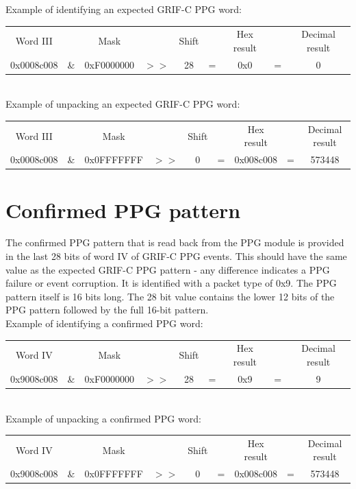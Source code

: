 \documentclass[letterpaper,12pt,notitlepage]{report}
\begin{document}
Example of identifying an expected GRIF-C PPG word:\\

\begin{tabular}{ccccccccc}
Word III &  & Mask & & Shift & & Hex result & & Decimal result\\
0x0008c008 & \& & 0xF0000000 & $>>$ & 28 & = & 0x0 & = & 0 \\
\end{tabular}\\

Example of unpacking an expected GRIF-C PPG word:\\

\begin{tabular}{ccccccccc}
Word III &  & Mask & & Shift & & Hex result & & Decimal result\\
0x0008c008 & \& & 0x0FFFFFFF & $>>$ & 0 & = & 0x008c008 & = & 573448 \\
\end{tabular}

\section{Confirmed PPG pattern}
The confirmed PPG pattern that is read back from the PPG module is provided in the last 28 bits of word IV of GRIF-C PPG events. This should have the same value as the expected GRIF-C PPG pattern - any difference indicates a PPG failure or event corruption. It is identified with a packet type of 0x9. The PPG pattern itself is 16 bits long. The 28 bit value contains the lower 12 bits of the PPG pattern followed by the full 16-bit pattern.\\

 Example of identifying a confirmed PPG word:\\

\begin{tabular}{ccccccccc}
Word IV &  & Mask & & Shift & & Hex result & & Decimal result\\
0x9008c008 & \& & 0xF0000000 & $>>$ & 28 & = & 0x9 & = & 9 \\
\end{tabular}\\

Example of unpacking a confirmed PPG word:\\

\begin{tabular}{ccccccccc}
Word IV &  & Mask & & Shift & & Hex result & & Decimal result\\
0x9008c008 & \& & 0x0FFFFFFF & $>>$ & 0 & = & 0x008c008 & = & 573448 \\
\end{tabular}
\end{document}
